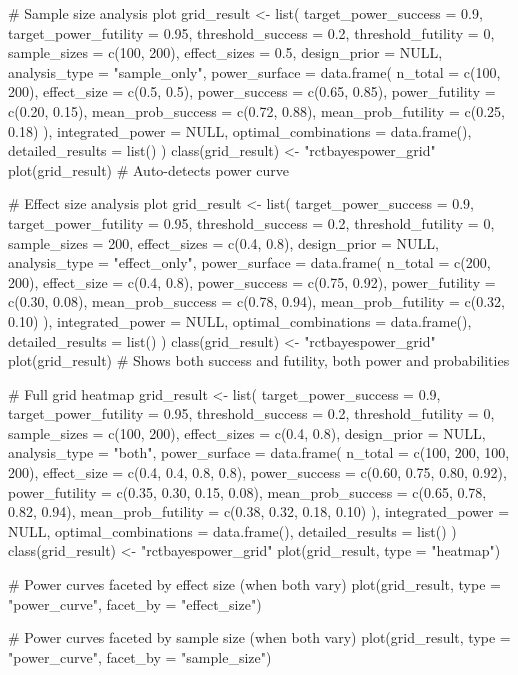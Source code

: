 \documentclass[letterpaper]{book}
\begin{document}
\begin{Examples}
\begin{ExampleCode}

# Sample size analysis plot
grid_result <- list(
  target_power_success = 0.9,
  target_power_futility = 0.95,
  threshold_success = 0.2,
  threshold_futility = 0,
  sample_sizes = c(100, 200),
  effect_sizes = 0.5,
  design_prior = NULL,
  analysis_type = "sample_only",
  power_surface = data.frame(
    n_total = c(100, 200),
    effect_size = c(0.5, 0.5),
    power_success = c(0.65, 0.85),
    power_futility = c(0.20, 0.15),
    mean_prob_success = c(0.72, 0.88),
    mean_prob_futility = c(0.25, 0.18)
  ),
  integrated_power = NULL,
  optimal_combinations = data.frame(),
  detailed_results = list()
)
class(grid_result) <- "rctbayespower_grid"
plot(grid_result) # Auto-detects power curve

# Effect size analysis plot
grid_result <- list(
  target_power_success = 0.9,
  target_power_futility = 0.95,
  threshold_success = 0.2,
  threshold_futility = 0,
  sample_sizes = 200,
  effect_sizes = c(0.4, 0.8),
  design_prior = NULL,
  analysis_type = "effect_only",
  power_surface = data.frame(
    n_total = c(200, 200),
    effect_size = c(0.4, 0.8),
    power_success = c(0.75, 0.92),
    power_futility = c(0.30, 0.08),
    mean_prob_success = c(0.78, 0.94),
    mean_prob_futility = c(0.32, 0.10)
  ),
  integrated_power = NULL,
  optimal_combinations = data.frame(),
  detailed_results = list()
)
class(grid_result) <- "rctbayespower_grid"
plot(grid_result) # Shows both success and futility, both power and probabilities

# Full grid heatmap
grid_result <- list(
  target_power_success = 0.9,
  target_power_futility = 0.95,
  threshold_success = 0.2,
  threshold_futility = 0,
  sample_sizes = c(100, 200),
  effect_sizes = c(0.4, 0.8),
  design_prior = NULL,
  analysis_type = "both",
  power_surface = data.frame(
    n_total = c(100, 200, 100, 200),
    effect_size = c(0.4, 0.4, 0.8, 0.8),
    power_success = c(0.60, 0.75, 0.80, 0.92),
    power_futility = c(0.35, 0.30, 0.15, 0.08),
    mean_prob_success = c(0.65, 0.78, 0.82, 0.94),
    mean_prob_futility = c(0.38, 0.32, 0.18, 0.10)
  ),
  integrated_power = NULL,
  optimal_combinations = data.frame(),
  detailed_results = list()
)
class(grid_result) <- "rctbayespower_grid"
plot(grid_result, type = "heatmap")

# Power curves faceted by effect size (when both vary)
plot(grid_result, type = "power_curve", facet_by = "effect_size")

# Power curves faceted by sample size (when both vary)
plot(grid_result, type = "power_curve", facet_by = "sample_size")

\end{ExampleCode}
\end{Examples}
\end{document}
